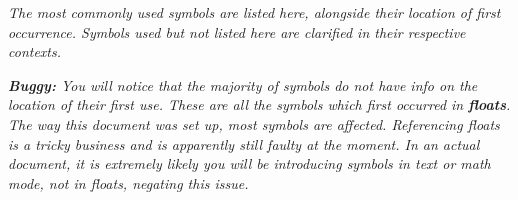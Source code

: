 \textit{The most commonly used symbols are listed here, alongside their location of first occurrence. Symbols used but not listed here are clarified in their respective contexts.}

\textit{\textbf{Buggy:} You will notice that the majority of symbols do not have info on the location of their first use.
These are all the symbols which first occurred in \textbf{floats}.
The way this document was set up, most symbols are affected.
Referencing floats is a tricky business and is apparently still faulty at the moment.
In an actual document, it is extremely likely you will be introducing symbols in text or math mode, not in floats, negating this issue.}
\printunsrtglossary[type = symbols, style = symbunitlong]
\printunsrtglossary[type = subsuper, style = mcolalttreegroup, nonumberlist]
\printunsrtglossary[type = abbreviations, style = myacr]
%
\listoffigures%
\listoftables%
%
\lstlistoflistings%
\cleardoubleoddpage%
%
